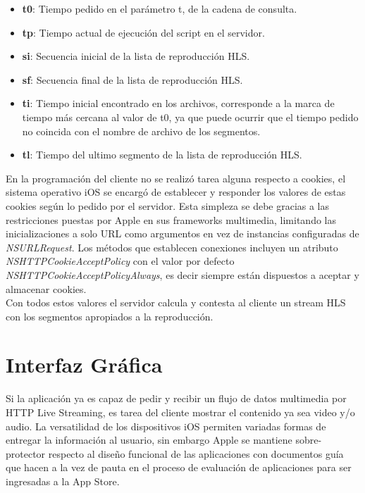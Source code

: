 \begin{itemize}
\item \textbf{t0}: Tiempo pedido en el parámetro t, de la cadena de consulta.
\item \textbf{tp}: Tiempo actual de ejecución del script en el servidor.
\item \textbf{si}: Secuencia inicial de la lista de reproducción HLS.
\item \textbf{sf}: Secuencia final de la lista de reproducción HLS.
\item \textbf{ti}: Tiempo inicial encontrado en los archivos, corresponde a la marca de tiempo más cercana al valor de t0, ya que puede ocurrir que el tiempo pedido no coincida con el nombre de archivo de los segmentos.
\item \textbf{tl}: Tiempo del ultimo segmento de la lista de reproducción HLS.

\end{itemize}
 
En la programación del cliente no se realizó tarea alguna respecto a cookies, el sistema operativo iOS se encargó de establecer y responder los valores de estas cookies según lo pedido por el servidor. Esta simpleza se debe gracias a las restricciones puestas por Apple en sus frameworks multimedia, limitando las inicializaciones a solo URL como argumentos en vez de instancias configuradas de \textit{NSURLRequest}. 
Los métodos que establecen conexiones incluyen un atributo \textit{NSHTTPCookieAcceptPolicy} con el valor por defecto \textit{NSHTTPCookieAcceptPolicyAlways}, es decir siempre están dispuestos a aceptar y almacenar cookies. \\

Con todos estos valores el servidor calcula y contesta al cliente un stream HLS con los segmentos apropiados a la reproducción.
	
	
\clearpage
\section{Interfaz Gráfica}

Si la aplicación ya es capaz de pedir y recibir un flujo de datos multimedia por HTTP Live Streaming, es tarea del cliente mostrar el contenido ya sea video y/o audio. La versatilidad de los dispositivos iOS permiten variadas formas de entregar la información al usuario, sin embargo Apple se mantiene sobre-protector respecto al diseño funcional de las aplicaciones con documentos guía que hacen a la vez de pauta en el proceso de evaluación de aplicaciones para ser ingresadas a la App Store.

